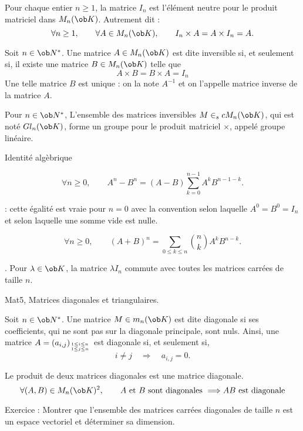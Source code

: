 \Propriete []  Pour chaque entier $n\ge1$, la matrice $I_n$ est l'élément neutre pour le produit matriciel dans $\sc M_n(\ob K)$. 
Autrement dit :
$$
\forall n\ge1, \qquad \forall A\in\sc M_n(\ob K), \qquad I_n\times A=A\times I_n=A.
$$

\Definition []  Soit $n\in\ob N^*$. Une matrice $A\in\sc M_n(\ob K)$ est dite inversible si, et seulement si, il existe une matrice $B\in\sc M_n(\ob K)$ telle que 
$$
A\times B=B\times A=I_n
$$
Une telle matrice $B$ est unique : on la note $A^{-1}$ et on l'appelle matrice inverse de la matrice $A$. 
\bigskip

\Propriete []  Pour $n\in\ob N^*$, L'ensemble des matrices inversibles $M\in_sc M_n(\ob K)$, qui est noté $\sc Gl_n(\ob K)$, forme un groupe pour le produit matriciel $\times$, appelé groupe linéaire. 
\bigskip

\Concept [] Identité algèbrique


\Theoreme [$A$ et $B$ matrices carrées de même taille vérifiant {$AB=BA$}]
$$
\forall n\ge0,\qquad A^n-B^n=(A-B)\sum_{k=0}^{n-1}A^kB^{n-1-k}.
$$

\Remarque : 
cette égalité est vraie pour $n=0$ avec la convention selon laquelle $A^0=B^0=I_n$ et selon laquelle une somme vide est nulle. 
\bigskip

\Theoreme [Title=Binôme de Newton;$A$ et $B$ matrices carrées de même taille vérifiant {$AB=BA$}] 
$$
\forall n\ge0,\qquad (A+B)^n=\sum_{0\le k\le n}{n\choose k}A^kB^{n-k}.
$$

\Remarque. Pour $\lambda\in\ob K$, la matrice $\lambda I_n$ commute avec toutes les matrices carrées de taille $n$. 
\bigskip

\Subsection Mat5, Matrices diagonales et triangulaires. 

\Definition []  Soit $n\in\ob N^*$. Une matrice $M\in\sc m_n(\ob K)$ est dite diagonale si ses coefficients, qui ne sont pas sur la diagonale principale, sont nuls. Ainsi, une matrice $A=(a_{i,j})_{1\le i\le n\atop1\le j\le n}$ est diagonale si, et seulement si, 
$$
i\neq j\quad \Longrightarrow\quad a_{i,j}=0.
$$

\Propriete []  Le produit de deux matrices diagonales est une matrice diagonale. 
$$
\forall (A,B)\in\sc M_n(\ob K)^2, \qquad A\mbox{ et }B \mbox{ sont diagonales }\Longrightarrow AB\mbox{ est diagonale}
$$

Exercice :  Montrer que l'ensemble des matrices carrées diagonales de taille $n$ est un espace vectoriel et déterminer sa dimension. 
\bigskip

